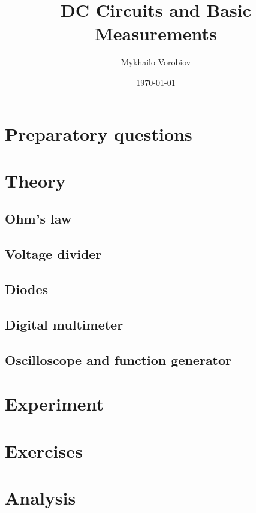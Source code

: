 \documentclass[reprint, 12pt, onecolumn]{revtex4-2}
\begin{document}
\title{DC Circuits and Basic Measurements}%

\author{Mykhailo Vorobiov}
%

\date{\today}

\begin{abstract}

\end{abstract}

\maketitle

\section*{Preparatory questions}
\section{Theory}
\subsection{Ohm's law}
\subsection{Voltage divider}
\subsection{Diodes}
\subsection{Digital multimeter}
\subsection{Oscilloscope and function generator}
\section{Experiment}
\section{Exercises}
\section{Analysis}

\end{document}
